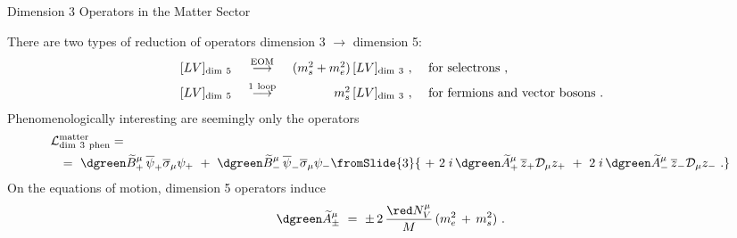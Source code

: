 \documentclass[pdf,PItalk,slideColor,colorBG,accumulate]{prosper}
\newcommand{\wt}{\widetilde}
\begin{document}

{
\begin{slide}[Replace]{ Dimension 3 Operators in the Matter Sector }

	There are two types of reduction of operators dimension 3 
	$ \to $ dimension 5:
\begin{equation}
\begin{array}{l c r l} 
\, [LV]_{\rm dim~5} & ~\stackrel{\mathrm {EOM}}{\longrightarrow}~ &
  (m_{s}^2 + m_e^2)\, [LV]_{\rm dim~3}~,~ &{\rm for~selectrons}~, 
\\[1ex] \,
[LV]_{\rm dim~5} &~ \stackrel{\mathrm {1\ loop}}{\longrightarrow}~ &
  m_{s}^2\, [LV]_{\rm dim~3}~,~ & {\rm for~fermions ~and ~vector~bosons}
~.
\end{array}
\nonumber
\end{equation}
%
	Phenomenologically interesting are seemingly only the operators
%
\begin{eqnarray*}
\lefteqn{
	{\cal L}_{\rm dim~3~phen}^{\rm matter} =
	}
	\\
	&& =~
  {\dgreen \wt{B}_+^\mu}\, \overline{\psi}_+\overline{\sigma}_\mu \psi_+ 
~+~ {\dgreen \wt{B}_-^\mu}\, \overline{\psi}_-\overline{\sigma}_\mu \psi_-
\fromSlide{3}{
 ~+~ 2\;i\, {\dgreen \wt{A}_+^\mu}\, \overline{z}_+ \mathcal{D}_\mu z_+ 
~+~ 2\;i\, {\dgreen \wt{A}_-^\mu}\, \overline{z}_-\mathcal{D}_\mu z_- 
	~.}
\end{eqnarray*}
%
	On the equations of motion, dimension 5 operators induce
 \begin{equation*}
{\dgreen \wt{A}_\pm^\mu} ~=~  
\pm\, 2\, \frac{{\red N_V^\mu}}{ M }  \, 
(m_e^2 \, +\,  m_s^2)~.
\end{equation*}

\end{slide}
}

\end{document}

